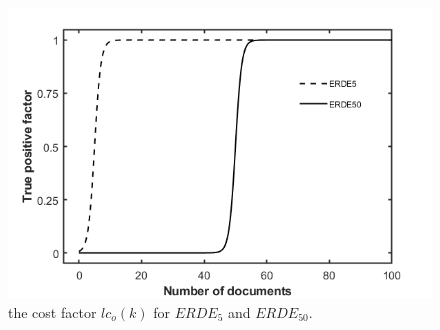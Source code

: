 

\begin{figure}[th]
	\centering
	\includegraphics[width=\linewidth]{figures/lco(k).jpg}
	\caption{the cost factor $lc_o(k)$ for $ERDE_5$ and $ERDE_{50}$.}
	\label{fig:lco}
\end{figure}

